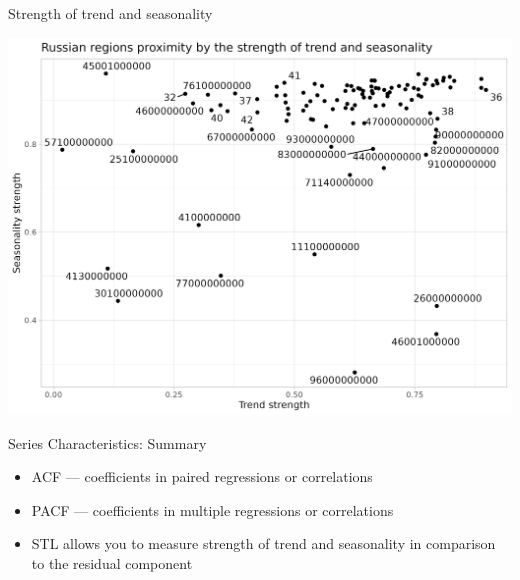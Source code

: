 \begin{frame}{Strength of trend and seasonality}
	
	\includegraphics[width=\textwidth]{pictures/om_ts_01-138.png}
	
	
\end{frame}



\begin{frame}{Series Characteristics: Summary}
	
	\begin{itemize}[<+->]
		\item ACF — coefficients in \alert{paired} regressions or correlations
		\item PACF — coefficients in \alert{multiple} regressions or correlations
		\item STL allows you to measure \alert{strength of trend and seasonality} in comparison to the residual component
	\end{itemize}
\end{frame}
